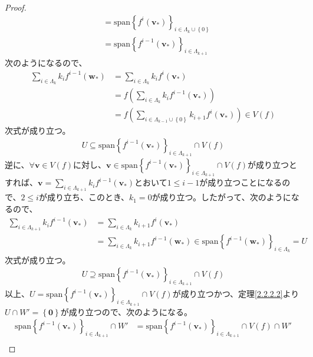 \documentclass[dvipdfmx]{jsarticle}
\begin{document}
\begin{proof}
\begin{align*}
&= {\mathrm{span}}\left\{ f^{i}\left( \mathbf{v}_{*} \right) \right\}_{i \in \varLambda_{k} \cup \left\{ 0 \right\}}\\
&= {\mathrm{span}}\left\{ f^{i - 1}\left( \mathbf{v}_{*} \right) \right\}_{i \in \varLambda_{k + 1}}
\end{align*}
次のようになるので、
\begin{align*}
\sum_{i \in \varLambda_{k}} {k_{i}f^{i - 1}\left( \mathbf{w}_{*} \right)} &= \sum_{i \in \varLambda_{k}} {k_{i}f^{i}\left( \mathbf{v}_{*} \right)}\\
&= f\left( \sum_{i \in \varLambda_{k}} {k_{i}f^{i - 1}\left( \mathbf{v}_{*} \right)} \right)\\
&= f\left( \sum_{i \in \varLambda_{k - 1} \cup \left\{ 0 \right\}} {k_{i + 1}f^{i}\left( \mathbf{v}_{*} \right)} \right) \in V(f)
\end{align*}
次式が成り立つ。
\begin{align*}
U \subseteq {\mathrm{span}}\left\{ f^{i - 1}\left( \mathbf{v}_{*} \right) \right\}_{i \in \varLambda_{k + 1}} \cap V(f)
\end{align*}
逆に、$\forall\mathbf{v} \in V(f)$に対し、$\mathbf{v} \in {\mathrm{span}}\left\{ f^{i - 1}\left( \mathbf{v}_{*} \right) \right\}_{i \in \varLambda_{k + 1}} \cap V(f)$が成り立つとすれば、$\mathbf{v} = \sum_{i \in \varLambda_{k + 1}} {k_{i}f^{i - 1}\left( \mathbf{v}_{*} \right)}$とおいて$1 \leq i - 1$が成り立つことになるので、$2 \leq i$が成り立ち、このとき、$k_{1} = 0$が成り立つ。したがって、次のようになるので、
\begin{align*}
\sum_{i \in \varLambda_{k + 1}} {k_{i}f^{i - 1}\left( \mathbf{v}_{*} \right)} &= \sum_{i \in \varLambda_{k}} {k_{i + 1}f^{i}\left( \mathbf{v}_{*} \right)}\\
&= \sum_{i \in \varLambda_{k}} {k_{i + 1}f^{i - 1}\left( \mathbf{w}_{*} \right)} \in {\mathrm{span}}\left\{ f^{i - 1}\left( \mathbf{w}_{*} \right) \right\}_{i \in \varLambda_{k}} = U
\end{align*}
次式が成り立つ。
\begin{align*}
U \supseteq {\mathrm{span}}\left\{ f^{i - 1}\left( \mathbf{v}_{*} \right) \right\}_{i \in \varLambda_{k + 1}} \cap V(f)
\end{align*}
以上、$U = {\mathrm{span}}\left\{ f^{i - 1}\left( \mathbf{v}_{*} \right) \right\}_{i \in \varLambda_{k + 1}} \cap V(f)$が成り立つかつ、定理\ref{2.2.2.2}より$U \cap W' = \left\{ \mathbf{0} \right\}$が成り立つので、次のようになる。
\begin{align*}
{\mathrm{span}}\left\{ f^{i - 1}\left( \mathbf{v}_{*} \right) \right\}_{i \in \varLambda_{k + 1}} \cap W' &= {\mathrm{span}}\left\{ f^{i - 1}\left( \mathbf{v}_{*} \right) \right\}_{i \in \varLambda_{k + 1}} \cap V(f) \cap W'\\

\end{align*}
\end{proof}
\end{document}
